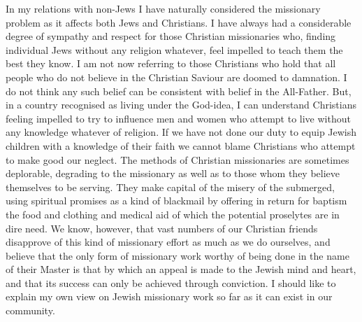 In my relations with non-Jews I have naturally
considered the missionary problem as it affects both Jews
and Christians. I have always had a considerable degree
of sympathy and respect for those Christian missionaries
who, finding individual Jews without any religion
whatever, feel impelled to teach them the best they
know. I am not now referring to those Christians who
hold that all people who do not believe in the
Christian Saviour are doomed to damnation. I do not
think any such belief can be consistent with belief in the
All-Father. But, in a country recognised as living under
the God-idea, I can understand Christians feeling
impelled to try to influence men and women who attempt to
live without any knowledge whatever of religion. If we
have not done our duty to equip Jewish children with a
knowledge of their faith we cannot blame Christians
who attempt to make good our neglect. The methods of
Christian missionaries are sometimes deplorable, degrading
to the missionary as well as to those whom they
believe themselves to be serving. They make capital of
the misery of the submerged, using spiritual promises as
a kind of blackmail by offering in return for baptism the
food and clothing and medical aid of which the potential
proselytes are in dire need. We know, however, that
vast numbers of our Christian friends disapprove of this
kind of missionary effort as much as we do ourselves, and
believe that the only form of missionary work worthy of
being done in the name of their Master is that by which
an appeal is made to the Jewish mind and heart, and that
its success can only be achieved through conviction. I
should like to explain my own view on Jewish missionary
work so far as it can exist in our community.

